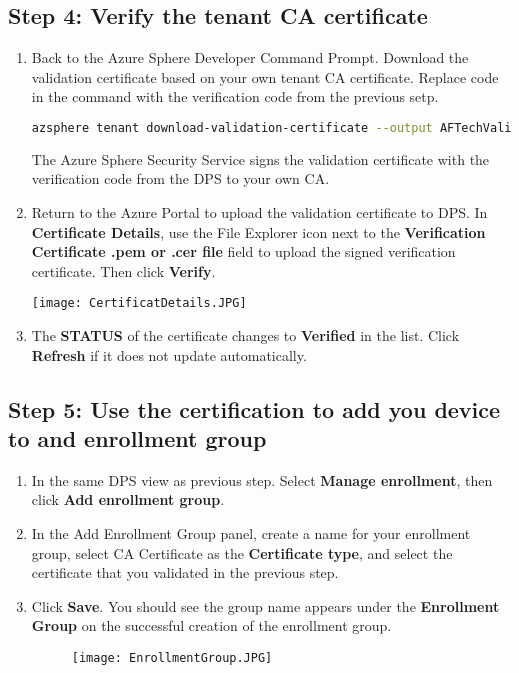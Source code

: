 \subsection{Step 4: Verify the tenant CA certificate}
\begin{enumerate}
    \item Back to the Azure Sphere Developer Command Prompt. Download the validation certificate based on your own tenant CA certificate. Replace code in the command with the verification code from the previous setp.
    \begin{lstlisting}[language=bash]
        azsphere tenant download-validation-certificate --output AFTechValidationCert.cer --verificationcode <code>
    \end{lstlisting}
    The Azure Sphere Security Service signs the validation certificate with the verification code from the DPS to your own CA.
    \item Return to the Azure Portal to upload the validation certificate to DPS. In \textbf{Certificate Details}, use the File Explorer icon next to the \textbf{Verification Certificate .pem or .cer file} field to upload the signed verification certificate. Then click \textbf{Verify}.
     \begin{minipage}{.45\textwidth}
        \centering
        \texttt{[image: CertificatDetails.JPG]}
    \end{minipage}
    \item The \textbf{STATUS} of the certificate changes to \textbf{Verified} in the list. Click \textbf{Refresh} if it does not update automatically.
\end{enumerate}
\newpage
\subsection{Step 5: Use the certification to add you device to and enrollment group}
\begin{enumerate}
    \item In the same DPS view as previous step. Select \textbf{Manage enrollment}, then click \textbf{Add enrollment group}.
    \item In the Add Enrollment Group panel, create a name for your enrollment group, select CA Certificate as the \textbf{Certificate type}, and select the certificate that you validated in the previous step.
    \item Click \textbf{Save}. You should see the group name appears under the \textbf{Enrollment Group} on the successful creation of the enrollment group.
    \begin{figure}[h]
        \centering
        \texttt{[image: EnrollmentGroup.JPG]}
    \end{figure}
\end{enumerate}

